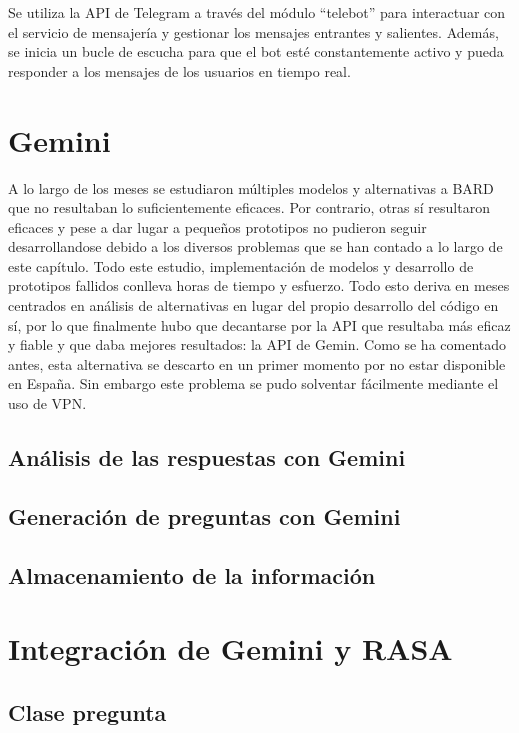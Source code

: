 Se utiliza la API de Telegram a través del módulo ``telebot'' para interactuar con el servicio de mensajería y gestionar los mensajes entrantes y salientes. Además, se inicia un bucle de escucha para que el bot esté constantemente activo y pueda responder a los mensajes de los usuarios en tiempo real.

\section{Gemini}
A lo largo de los meses se estudiaron múltiples modelos y alternativas a BARD que no resultaban lo suficientemente eficaces. Por contrario, otras sí resultaron eficaces y pese a dar lugar a pequeños prototipos no pudieron seguir desarrollandose debido a los diversos problemas que se han contado a lo largo de este capítulo. Todo este estudio, implementación de modelos y desarrollo de prototipos fallidos conlleva horas de tiempo y esfuerzo. Todo esto deriva en meses centrados en análisis de alternativas en lugar del propio desarrollo del código en sí, por lo que finalmente hubo que decantarse por la API que resultaba más eficaz y fiable y que daba mejores resultados: la API de Gemin. Como se ha comentado antes, esta alternativa se descarto en un primer momento por no estar disponible en España. Sin embargo este problema se pudo solventar fácilmente mediante el uso de VPN.


\subsection{Análisis de las respuestas con Gemini}
\subsection{Generación de preguntas con Gemini}
\subsection{Almacenamiento de la información}
\section{Integración de Gemini y RASA}
\subsection{Clase pregunta}

